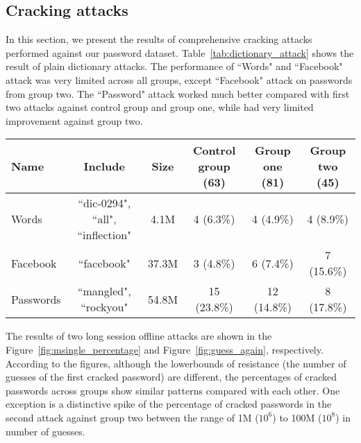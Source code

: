 \documentclass[conference]{IEEEtran}
\begin{document}
\subsection{Cracking attacks}



In this section, we present the results of comprehensive cracking attacks performed against our password dataset. Table~\ref{tab:dictionary_attack} shows the result of plain dictionary attacks. The performance of ``Words" and ``Facebook" attack was very limited across all groups, except ``Facebook" attack on passwords from group two. The ``Password" attack worked much better compared with first two attacks against control group and group one, while had very limited improvement against group two.

\begin{table*}[tbph]
\begin{center}
  \begin{tabular}{ l | c | c | c | c | c }
    \hline
    Name & Include & Size & Control group (63) & Group one (81) & Group two (45) \\ \hline
    Words & ``dic-0294", ``all", ``inflection" & 4.1M & 4 (6.3\%) & 4 (4.9\%) & 4 (8.9\%) \\
    Facebook & ``facebook" & 37.3M & 3 (4.8\%) & 6 (7.4\%) & 7 (15.6\%) \\
    Passwords & ``mangled", ``rockyou" & 54.8M & 15 (23.8\%) & 12 (14.8\%) & 8 (17.8\%) \\
    \hline
  \end{tabular}
  \caption{Results of plain dictionary attack with different dictionaries. ``Include" included all dictionaries we used in each attack. The size is the number of unique entries each combined dictionary has.}
    \label{tab:dictionary_attack}
\end{center}
\end{table*}

The results of two long session offline attacks are shown in the Figure~\ref{fig:msingle_percentage} and Figure~\ref{fig:guess_again}, respectively. According to the figures, although the lowerbounds of resistance (the number of guesses of the first cracked password) are different, the percentages of cracked passwords across groups show similar patterns compared with each other. One exception is a distinctive spike of the percentage of cracked passwords in the second attack against group two between the range of 1M ($10^{6}$) to 100M ($10^{8}$) in number of guesses.
\end{document}
